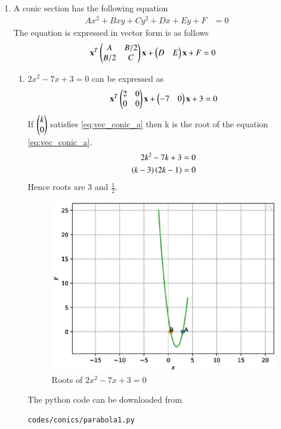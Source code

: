 \renewcommand{\theequation}{\theenumi}
\begin{enumerate}[label=\thesection.\arabic*.,ref=\thesection.\theenumi]

\item A conic section has the following equation 
\begin{align}
Ax^2+Bxy+Cy^2+Dx+Ey+F &= 0
\label{eq:alg_conic}
\end{align}
The equation is expressed in vector form is as follows
\begin{align}
\label{eq:vec_conic}
\mathbf{x}^T \begin{pmatrix}A & B/2\\B/2 & C\end{pmatrix}\mathbf{x}+ \begin{pmatrix}D & E\end{pmatrix}\mathbf{x}+F &= 0
\end{align}

\begin{enumerate}

\item 
$2x^2 - 7x + 3 = 0$ can be expressed as 
\begin{align}
\label{eq:vec_conic_a}
\mathbf{x}^T \begin{pmatrix}2 & 0\\0 & 0\end{pmatrix}\mathbf{x}+ \begin{pmatrix}-7 & 0\end{pmatrix}\mathbf{x}+3=0
\end{align}
If $\begin{pmatrix}k\\0\end{pmatrix}$ satisfies \ref{eq:vec_conic_a} then k is the root of the equation \eqref{eq:vec_conic_a}.
\begin{align}
2k^{2}-7k+3 &= 0 \\
\left(k-3\right)\left(2k-1\right) &= 0
\end{align}
Hence roots are 3 and $\frac{1}{2}$. 
\begin{figure}[!ht]
\centering
\includegraphics[width= \columnwidth]{./figs/conics/parabola1.eps}
\caption{Roots of $2x^2 - 7x + 3 = 0$}
\end{figure}
The python code can be downloaded from
\begin{lstlisting}
codes/conics/parabola1.py
\end{lstlisting}


\end{enumerate}
\end{enumerate}
